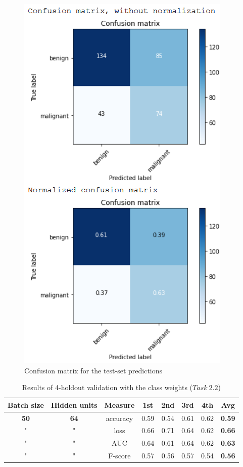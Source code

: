 \documentclass[11pt,a4paper,oneside]{article}
\begin{document}
\begin{figure}[h]
\begin{minipage}[c]{.4\textwidth}
		\includegraphics[width=.9\textwidth]{images/2.2/7_matrix}
		\caption{Confusion matrix for the test-set predictions}
		\label{fig:matrix_2.2_1_weights}
	\end{minipage}%
\end{figure}

\begin{table}[h]
\centering
\begin{tabular}{|cccccccc|}
\hline
Batch size & Hidden units & Measure & 1st & 2nd & 3rd & 4th & \textbf{Avg} \\
\hline
\textbf{50} & \textbf{64} & accuracy & 0.59 & 0.54 & 0.61 & 0.62 & \textbf{0.59} \\
" & " & loss & 0.66 & 0.71 & 0.64 & 0.62 & \textbf{0.66} \\
" & " & AUC & 0.64 & 0.61 & 0.64 & 0.62 & \textbf{0.63} \\
" & " & F-score & 0.57 & 0.56 & 0.57 & 0.54 & \textbf{0.56} \\
\hline
\end{tabular}
\caption{Results of 4-holdout validation with the class weights ($Task\ 2.2$)}
\label{tab:task2.2_weight}
\end{table}
\end{document}
